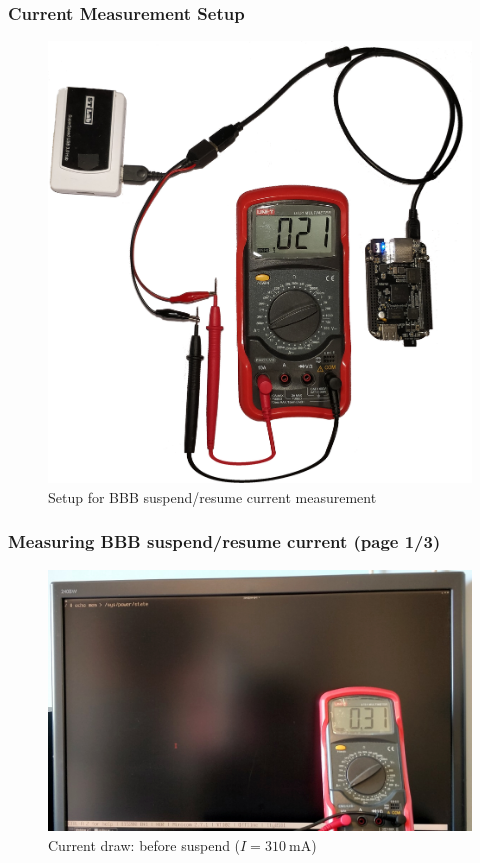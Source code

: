\begin{frame}
  \frametitle{Current Measurement Setup}
  \begin{figure}
    \centering
    \includegraphics[scale=0.07]{images/multimeter-setup.png}
    \caption{Setup for BBB suspend/resume current measurement}
  \end{figure}
  \vspace*{-10mm}
\end{frame}

\begin{frame}
  \frametitle{Measuring BBB suspend/resume current (page 1/3)}
  \begin{figure}
    \centering
    \includegraphics[scale=0.28]{images/multimeter-demo-1.jpg}
    \caption{Current draw: before suspend ($ I = \SI{310}{\mA} $)}
  \end{figure}
  \vspace*{-5mm}
\end{frame}


